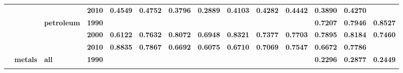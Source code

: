 \documentclass[
  authoryear,
  preprint,
  3p]{elsarticle}
\begin{document}
\begin{landscape}
\begin{longtable}[t]{>{}l>{}l>{}l>{}l>{}r>{}r>{}r>{}r>{}r>{}r>{}r>{}r>{}r>{}r}
\addlinespace
\textbf{} & \textbf{} & \textbf{} & \textbf{2010} & \textcolor[HTML]{4285f4}{\textbf{0.4549}} & \textcolor[HTML]{4285f4}{\textbf{0.4752}} & \textcolor[HTML]{4285f4}{\textbf{0.3796}} & \textcolor[HTML]{4285f4}{\textbf{0.2889}} & \textcolor[HTML]{4285f4}{\textbf{0.4103}} & \textcolor[HTML]{4285f4}{\textbf{0.4282}} & \textcolor[HTML]{4285f4}{\textbf{0.4442}} & \textcolor[HTML]{4285f4}{\textbf{0.3890}} & \textcolor[HTML]{4285f4}{\textbf{0.4270}} & \textcolor[HTML]{4285f4}{\textbf{}}\\
\textbf{} & \textbf{} & \textbf{petroleum} & \textbf{1990} & \textcolor[HTML]{4285f4}{\textbf{}} & \textcolor[HTML]{4285f4}{\textbf{}} & \textcolor[HTML]{4285f4}{\textbf{}} & \textcolor[HTML]{4285f4}{\textbf{}} & \textcolor[HTML]{4285f4}{\textbf{}} & \textcolor[HTML]{4285f4}{\textbf{}} & \textcolor[HTML]{4285f4}{\textbf{}} & \textcolor[HTML]{4285f4}{\textbf{0.7207}} & \textcolor[HTML]{4285f4}{\textbf{0.7946}} & \textcolor[HTML]{4285f4}{\textbf{0.8527}}\\
\textbf{} & \textbf{} & \textbf{} & \textbf{2000} & \textcolor[HTML]{4285f4}{\textbf{0.6122}} & \textcolor[HTML]{4285f4}{\textbf{0.7632}} & \textcolor[HTML]{4285f4}{\textbf{0.8072}} & \textcolor[HTML]{4285f4}{\textbf{0.6948}} & \textcolor[HTML]{4285f4}{\textbf{0.8321}} & \textcolor[HTML]{4285f4}{\textbf{0.7377}} & \textcolor[HTML]{4285f4}{\textbf{0.7703}} & \textcolor[HTML]{4285f4}{\textbf{0.7895}} & \textcolor[HTML]{4285f4}{\textbf{0.8184}} & \textcolor[HTML]{4285f4}{\textbf{0.7460}}\\
\textbf{} & \textbf{} & \textbf{} & \textbf{2010} & \textcolor[HTML]{4285f4}{\textbf{0.8835}} & \textcolor[HTML]{4285f4}{\textbf{0.7867}} & \textcolor[HTML]{4285f4}{\textbf{0.6692}} & \textcolor[HTML]{4285f4}{\textbf{0.6075}} & \textcolor[HTML]{4285f4}{\textbf{0.6710}} & \textcolor[HTML]{4285f4}{\textbf{0.7069}} & \textcolor[HTML]{4285f4}{\textbf{0.7547}} & \textcolor[HTML]{4285f4}{\textbf{0.6672}} & \textcolor[HTML]{4285f4}{\textbf{0.7786}} & \textcolor[HTML]{4285f4}{\textbf{}}\\
\textbf{} & \textbf{metals} & \textbf{all} & \textbf{1990} & \textcolor[HTML]{4285f4}{\textbf{}} & \textcolor[HTML]{4285f4}{\textbf{}} & \textcolor[HTML]{4285f4}{\textbf{}} & \textcolor[HTML]{4285f4}{\textbf{}} & \textcolor[HTML]{4285f4}{\textbf{}} & \textcolor[HTML]{4285f4}{\textbf{}} & \textcolor[HTML]{4285f4}{\textbf{}} & \textcolor[HTML]{4285f4}{\textbf{0.2296}} & \textcolor[HTML]{4285f4}{\textbf{0.2877}} & \textcolor[HTML]{4285f4}{\textbf{0.2449}}\\
\addlinespace

\end{longtable}
\end{landscape}
\end{document}
